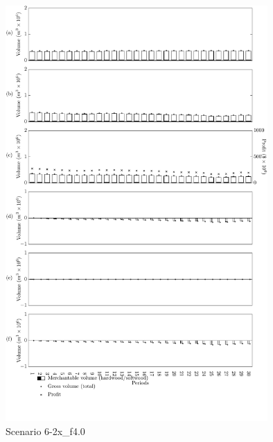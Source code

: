 \begin{figure}[h]
  \centering
  \includegraphics[width=10cm]{images/appendix/s6-2x_test50}
  \caption{Scenario 6-2x\_f4.0}
  \label{fig:s6-2x_test50}
\end{figure}

